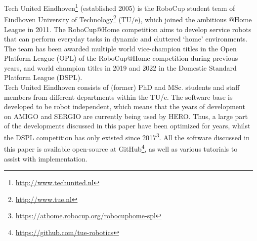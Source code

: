 Tech United Eindhoven\footnote{\url{http://www.techunited.nl}} (established 2005) is the RoboCup student team of Eindhoven University of Technology\footnote{\url{http://www.tue.nl}} (TU/e), which joined the ambitious @Home League in 2011. The RoboCup@Home competition aims to develop service robots that can perform everyday tasks in dynamic and cluttered `home' environments.
The team has been awarded multiple world vice-champion titles in the Open Platform League (OPL) of the RoboCup@Home competition during previous years, and world champion titles in 2019 and 2022 in the Domestic Standard Platform League (DSPL). \\

\noindent Tech United Eindhoven consists of (former) PhD and MSc. students and staff members from different departments within the TU/e. The software base is developed to be robot independent, which means that the years of development on AMIGO and SERGIO are currently being used by HERO. Thus, a large part of the developments discussed in this paper have been optimized for years, whilst the DSPL competition has only existed since 2017\footnote{\url{https://athome.robocup.org/robocuphome-spl}}. All the software discussed in this paper is available open-source at GitHub\footnote{\url{https://github.com/tue-robotics}}, as well as various tutorials to assist with implementation. 


